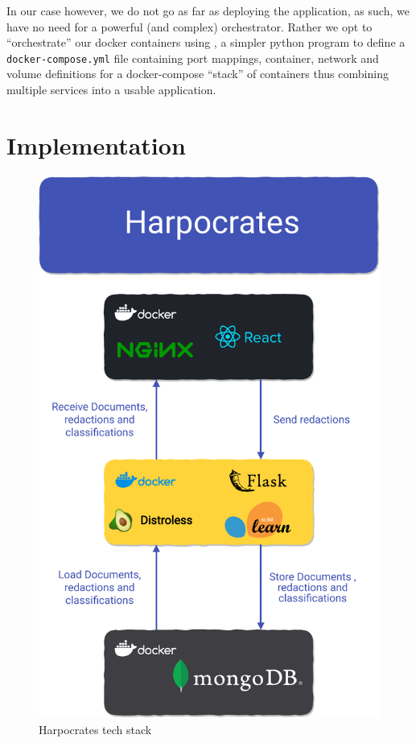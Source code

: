 \documentclass[\version]{l4proj}
\begin{document}
In our case however, we do not go as far as deploying the application, as such, we have no need for a powerful (and complex) orchestrator.
Rather we opt to ``orchestrate'' our docker containers using \textcite{DockerCompose2020}, a simpler python program to define a \verb|docker-compose.yml| file containing port mappings, container, network and volume definitions for a docker-compose ``stack'' of containers thus combining multiple services into a usable application.




\chapter{Implementation}

\begin{figure}
    \includegraphics[width=\linewidth]{figures/tech_stack_no_background.pdf}
    \caption{Harpocrates tech stack}\label{fig:tech_stack}
    \vspace{-50pt}
\end{figure}
\end{document}
